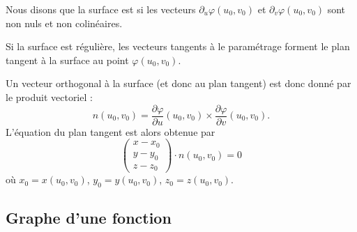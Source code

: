 \begin{definition}      \label{DefSurfReguliere}
	Nous disons que la surface est  si les vecteurs \( \partial_u\varphi(u_0,v_0)\) et \( \partial_v\varphi(u_0,v_0)\) sont non nuls et non colinéaires.
\end{definition}
Si la surface est régulière, les vecteurs tangents à le paramétrage forment le plan tangent à la surface au point \( \varphi(u_0,v_0)\).

Un vecteur orthogonal à la surface (et donc au plan tangent) est donc donné par le produit vectoriel :
\begin{equation}
	n(u_0,v_0)=\frac{ \partial \varphi }{ \partial u }(u_0,v_0)  \times \frac{ \partial \varphi }{ \partial v }(u_0,v_0).
\end{equation}
L'équation du plan tangent est alors obtenue par
\begin{equation}        \label{EqPlanTgSurfaceParm}
	\begin{pmatrix}
		x-x_0 \\
		y-y_0 \\
		z-z_0
	\end{pmatrix}\cdot n(u_0,v_0)=0
\end{equation}
où \( x_0=x(u_0,v_0)\), \( y_0=y(u_0,v_0)\), \( z_0=z(u_0,v_0)\).

\subsection{Graphe d'une fonction}

